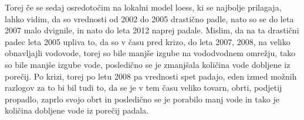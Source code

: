 \documentclass[11pt,a4paper]{article}
\begin{document}
Torej če se sedaj osredotočim na lokalni model loess, ki se najbolje prilagaja, lahko vidim, da so vrednosti od 2002 do 2005 drastično padle, nato so se do leta 2007 malo dvignile, in nato do leta 2012 naprej padale. Mislim, da na ta drastični padec leta 2005 upliva to, da so v času pred krizo, do leta 2007, 2008, na veliko obnavljajli vodovode, torej so bile manjše izgube na vododvodnem omrežju, tako so bile manjše izgube vode, posledično se je zmanjšala količina vode dobljene iz porečij. Po krizi, torej po letu 2008 pa vrednosti spet padajo, eden izmed možnih razlogov za to bi bil tudi to, da se je v tem času veliko tovarn, obrti, podjetij propadlo, zaprlo svojo obrt in  posledično se je porabilo manj vode in tako je količina dobljene vode iz porečij padala.







% 
% 
% 
% 
% 
% 
% 




% 
% 
% 
% 
\end{document}
